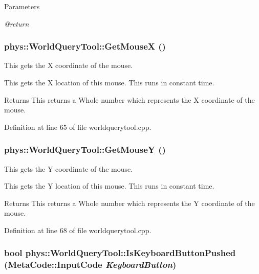 \begin{DoxyParams}{Parameters}
\item[{\em @return}]\end{DoxyParams}
\hypertarget{classphys_1_1WorldQueryTool_a55721f152fb117fdfb8bc6d20af6b1dc}{
\subsubsection[{GetMouseX}]{ phys::WorldQueryTool::GetMouseX ()}}
\label{d8/d69/classphys_1_1WorldQueryTool_a55721f152fb117fdfb8bc6d20af6b1dc}


This gets the X coordinate of the mouse. 

This gets the X location of this mouse. This runs in constant time. \begin{DoxyReturn}{Returns}
This returns a Whole number which represents the X coordinate of the mouse. 
\end{DoxyReturn}


Definition at line 65 of file worldquerytool.cpp.

\hypertarget{classphys_1_1WorldQueryTool_ac2d8517db7305157c1393320f434751b}{
\subsubsection[{GetMouseY}]{ phys::WorldQueryTool::GetMouseY ()}}
\label{d8/d69/classphys_1_1WorldQueryTool_ac2d8517db7305157c1393320f434751b}


This gets the Y coordinate of the mouse. 

This gets the Y location of this mouse. This runs in constant time. \begin{DoxyReturn}{Returns}
This returns a Whole number which represents the Y coordinate of the mouse. 
\end{DoxyReturn}


Definition at line 68 of file worldquerytool.cpp.

\hypertarget{classphys_1_1WorldQueryTool_a8343f54b900adb316ddc6de5405da328}{
\subsubsection[{IsKeyboardButtonPushed}]{\setlength{\rightskip}{0pt plus 5cm}bool phys::WorldQueryTool::IsKeyboardButtonPushed ({\bf MetaCode::InputCode} {\em KeyboardButton})}}
\label{d8/d69/classphys_1_1WorldQueryTool_a8343f54b900adb316ddc6de5405da328}


